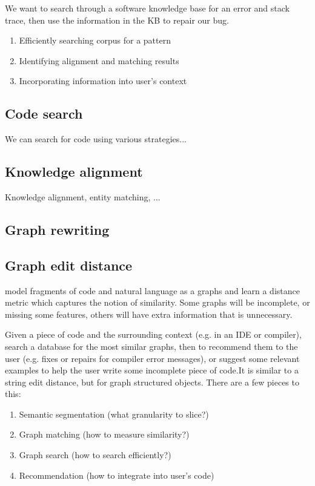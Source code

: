 \documentclass[11pt]{article}
\begin{document}
    We want to search through a software knowledge base for an error and stack trace, then use the information in the KB to repair our bug.

    \begin{enumerate}
        \item Efficiently searching corpus for a pattern
        \item Identifying alignment and matching results
        \item Incorporating information into user's context
    \end{enumerate}


    \subsection{Code search}

    We can search for code using various strategies...

    \subsection{Knowledge alignment}

    Knowledge alignment, entity matching, ...

    \subsection{Graph rewriting}

    \subsection{Graph edit distance}

    model fragments of code and natural language as a graphs and learn a distance metric which captures the notion of similarity. Some graphs will be incomplete, or missing some features, others will have extra information that is unnecessary.

    Given a piece of code and the surrounding context (e.g. in an IDE or compiler), search a database for the most similar graphs, then to recommend them to the user (e.g. fixes or repairs for compiler error messages), or suggest some relevant examples to help the user write some incomplete piece of code.It is similar to a string edit distance, but for graph structured objects. There are a few pieces to this:

    \begin{enumerate}
    \item Semantic segmentation (what granularity to slice?)
    \item Graph matching (how to measure similarity?)
    \item Graph search (how to search efficiently?)
    \item Recommendation (how to integrate into user's code)
    \end{enumerate}
\end{document}
